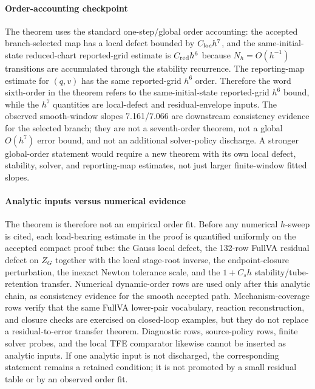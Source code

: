 \documentclass[preprint,12pt]{elsarticle}
\newcommand{\tfe}{TFE}
\begin{document}
\paragraph{Order-accounting checkpoint}
The theorem uses the standard one-step/global order accounting: the accepted
branch-selected map has a local defect bounded by \(C_{\rm loc}h^7\), and
the same-initial-state reduced-chart reported-grid estimate is
\(C_{\rm red}h^6\) because \(N_h=O(h^{-1})\) transitions are accumulated
through the stability recurrence.  The reporting-map estimate for \((q,v)\)
has the same reported-grid \(h^6\) order.  Therefore the word sixth-order in
the theorem refers to the same-initial-state reported-grid \(h^6\) bound,
while the \(h^7\) quantities are local-defect and residual-envelope inputs.
The observed smooth-window slopes
7.161/7.066 are downstream consistency evidence for the selected branch; they
are not a seventh-order theorem, not a global \(O(h^7)\) error bound, and not
an additional solver-policy discharge.  A stronger global-order statement
would require a new theorem with its own local defect, stability, solver, and
reporting-map estimates, not just larger finite-window fitted slopes.

\paragraph{Analytic inputs versus numerical evidence}
The theorem is therefore not an empirical order fit. Before any numerical
\(h\)-sweep is cited, each load-bearing estimate in the proof is quantified
uniformly on the accepted compact proof tube: the Gauss local defect, the
132-row FullVA residual defect on \(Z_G\) together with the local stage-root
inverse, the endpoint-closure perturbation, the inexact Newton tolerance
scale, and the \(1+C_sh\) stability/tube-retention transfer. Numerical
dynamic-order rows are used only after this analytic chain, as consistency
evidence for the smooth accepted path. Mechanism-coverage rows verify that
the same FullVA lower-pair vocabulary, reaction reconstruction, and closure
checks are exercised on closed-loop examples, but they do not replace a
residual-to-error transfer theorem. Diagnostic rows, source-policy rows, finite
solver probes, and the local \tfe{} comparator likewise cannot be inserted
as analytic inputs. If one analytic input is not discharged, the corresponding
statement remains a retained condition; it is not promoted by a small
residual table or by an observed order fit.
\end{document}
